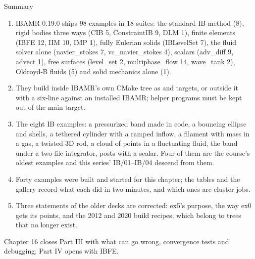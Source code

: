 \documentclass[aspectratio=169,11pt]{beamer}
\begin{document}
\begin{frame}{Summary}
\label{fr:summary}
\footnotesize
\begin{enumerate}
  \item IBAMR 0.19.0 ships $98$ examples in $18$ suites: the standard IB method (8), rigid bodies three ways (CIB 5, ConstraintIB 9, DLM 1), finite elements (IBFE 12, IIM 10, IMP 1), fully Eulerian solids (IBLevelSet 7), the fluid solver alone (navier\_stokes 7, vc\_navier\_stokes 4), scalars (adv\_diff 9, advect 1), free surfaces (level\_set 2, multiphase\_flow 14, wave\_tank 2), Oldroyd-B fluids (5) and solid mechanics alone (1).
  \item They build inside IBAMR's own CMake tree as  and  targets, or outside it with a six-line  against an installed IBAMR; helper programs must be kept out of the main target.
  \item The eight IB examples: a pressurized band made in code, a bouncing ellipse and shells, a tethered cylinder with a ramped inflow, a filament with mass in a gas, a twisted 3D rod, a cloud of points in a fluctuating fluid, the band under a two-file integrator, posts with a scalar. Four of them are the course's oldest examples and this series' IB/01--IB/04 descend from them.
  \item Forty examples were built and started for this chapter; the tables and the gallery record what each did in two minutes, and which ones are cluster jobs.
  \item Three statements of the older decks are corrected: ex5's purpose, the way ex0 gets its points, and the 2012 and 2020 build recipes, which belong to trees that no longer exist.
\end{enumerate}
\begin{homebox}
\footnotesize Chapter 16 closes Part III with what can go wrong, convergence tests and debugging; Part IV opens with IBFE.
\end{homebox}
\end{frame}
\end{document}

